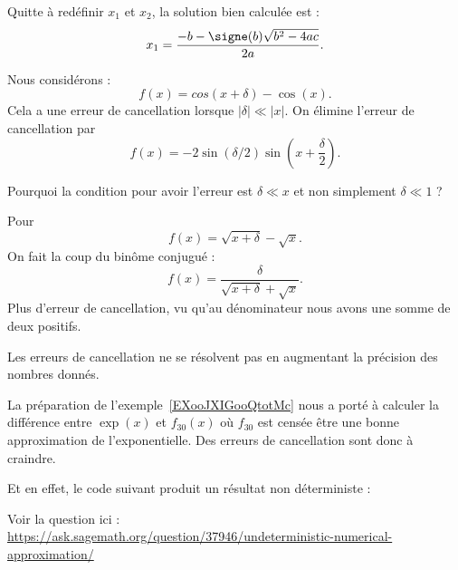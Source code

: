 Quitte à redéfinir \( x_1\) et \( x_2\), la solution bien calculée est :
\begin{equation}
	x_1=\frac{ -b-\signe(b)\sqrt{b^2-4ac} }{ 2a }.
\end{equation}

\begin{example}
	Nous considérons :
	\begin{equation}
		f(x)=cos(x+\delta)-\cos(x).
	\end{equation}
	Cela a une erreur de cancellation lorsque \( | \delta |\ll | x |\). On élimine l'erreur de cancellation par
	\begin{equation}
		f(x)=-2\sin(\delta/2)\sin\left( x+\frac{ \delta }{ 2 } \right).
	\end{equation}

	\begin{probleme}
		Pourquoi la condition pour avoir l'erreur est \( \delta\ll x\) et non simplement \( \delta\ll 1\) ?
	\end{probleme}

\end{example}

\begin{example}
	Pour
	\begin{equation}
		f(x)=\sqrt{x+\delta}-\sqrt{x}.
	\end{equation}
	On fait la coup du binôme conjugué :
	\begin{equation}
		f(x)=\frac{ \delta }{ \sqrt{x+\delta}+\sqrt{x} }.
	\end{equation}
	Plus d'erreur de cancellation, vu qu'au dénominateur nous avons une somme de deux positifs.
\end{example}

Les erreurs de cancellation ne se résolvent pas en augmentant la précision des nombres donnés.

\begin{example}
    La préparation de l'exemple~\ref{EXooJXIGooQtotMc} nous a porté à calculer la différence entre \( \exp(x)\) et \( f_{30}(x)\) où \( f_{30}\) est censée être une bonne approximation de l'exponentielle. Des erreurs de cancellation sont donc à craindre.

Et en effet, le code suivant produit un résultat non déterministe :


Voir la question ici :\\ \url{https://ask.sagemath.org/question/37946/undeterministic-numerical-approximation/}

\end{example}

